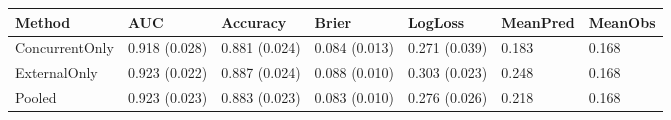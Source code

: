 \begin{tabular}{lllllll}
\toprule
Method & AUC & Accuracy & Brier & LogLoss & MeanPred & MeanObs \\
\midrule
ConcurrentOnly & 0.918 (0.028) & 0.881 (0.024) & 0.084 (0.013) & 0.271 (0.039) & 0.183 & 0.168 \\
ExternalOnly & 0.923 (0.022) & 0.887 (0.024) & 0.088 (0.010) & 0.303 (0.023) & 0.248 & 0.168 \\
Pooled & 0.923 (0.023) & 0.883 (0.023) & 0.083 (0.010) & 0.276 (0.026) & 0.218 & 0.168 \\
\bottomrule
\end{tabular}
